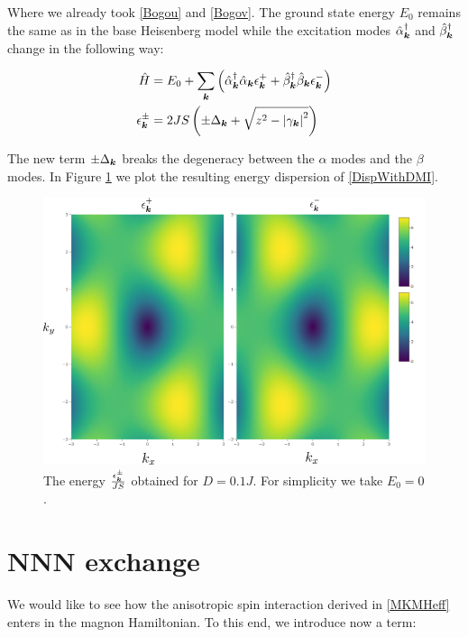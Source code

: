 Where we already took \ref{Bogou} and \ref{Bogov}. The ground state energy $E_0$ remains the same as in the base Heisenberg model while the excitation modes $\hat{\alpha}_{\boldsymbol{k}}^\dagger$ and $\hat{\beta}_{\boldsymbol{k}}^\dagger$ change in the following way:

\begin{align}
\hat{H} &= E_0 + \sum_{\boldsymbol{k}} \left( \hat{\alpha}_{\boldsymbol{k}}^\dagger \hat{\alpha}_{\boldsymbol{k}} \epsilon_{\boldsymbol{k}}^+ +\hat{\beta}_{\boldsymbol{k}}^\dagger \hat{\beta}_{\boldsymbol{k}}  \epsilon_{\boldsymbol{k}}^- \right) \label{DispWithDMI} \\
\epsilon_{\boldsymbol{k}}^\pm &= 2JS \left( \pm \Delta_{\boldsymbol{k}} + \sqrt{z^2-\abs{\gamma_{\boldsymbol{k}}}^2} \right)
\end{align}

The new term $\pm \Delta_{\boldsymbol{k}}$ breaks the degeneracy between the $\alpha$ modes and the $\beta$ modes. In Figure \ref{Fig.Magnon.Disp} we plot the resulting energy dispersion of \ref{DispWithDMI}.

\begin{figure}
\centering
  \includegraphics[width=0.7\linewidth]{../Figures/magnon_disp_2.png}
  \caption{The energy $\frac{\epsilon_{\boldsymbol{k}}^\pm}{JS}$ obtained for $D=0.1J$. For simplicity we take $E_0 = 0$. }
\label{Fig.Magnon.Disp}
\end{figure}

\section{NNN exchange}

We would like to see how the anisotropic spin interaction derived in \ref{MKMHeff} enters in the magnon Hamiltonian. To this end, we introduce now a term:

